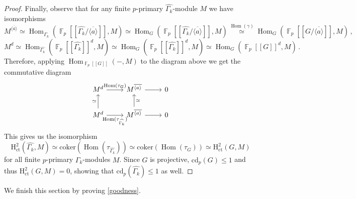 \documentclass[a4paper]{amsart}
\theoremstyle{definition}
\theoremstyle{remark}
\DeclareMathOperator{\bbf}{\mathbb{F}}
\DeclareMathOperator{\Hom}{\mathrm{Hom}}
\newcommand{\FFalgebra}[1]{\bbf_p[\![#1]\!]}
\newcommand{\HH}{\mathrm{H}}
\begin{document}
\begin{proof}
Finally, observe that for any finite \(p\)-primary \(\widehat{\Gamma_k}\)-module \(M\) we have isomorphisms \[M^{\overline{\langle a \rangle}} \simeq\Hom_{\widehat{\Gamma_k}}(\FFalgebra{\widehat{\Gamma_k}/\overline{\langle a \rangle}}, M) \simeq \Hom_G(\FFalgebra{\widehat{\Gamma_k}/\overline{\langle a \rangle}},M) \overset{\Hom(\gamma)}{\simeq} \Hom_G(\FFalgebra{G/\overline{\langle a \rangle}},M)\,,\]
\[M^d \simeq \Hom_{\widehat{\Gamma_k}}(\FFalgebra{\widehat{\Gamma_k}}^d,M) \simeq \Hom_G(\FFalgebra{\widehat{\Gamma_k}}^d,M) \simeq \Hom_G(\FFalgebra{G}^d,M)\,.\] Therefore, applying \(\Hom_{\FFalgebra{G}}(-,M)\) to the diagram above we get the commutative diagram \[\begin{tikzcd}
M^d \arrow[r, "\Hom(\tau_G)"]                                         & M^{\overline{\langle a \rangle}} \arrow[r]                      & 0 \\
M^d \arrow[r, "\Hom(\tau_{\widehat{\Gamma_k}})"'] \arrow[u, "\simeq"] & M^{\overline{\langle a \rangle}} \arrow[r] \arrow[u, "\simeq"'] & 0
\end{tikzcd}\]
This gives us the isomorphism \[\HH^2_{\mathrm{ct}}(\widehat{\Gamma_k},M) \simeq \mathrm{coker}(\Hom(\tau_{\widehat{\Gamma_k}})) \simeq \mathrm{coker}(\Hom(\tau_G)) \simeq \HH^2_{\mathrm{ct}}(G,M)\] for all finite \(p\)-primary \(\widehat{\Gamma_k}\)-modules \(M\). Since \(G\) is projective, \(\mathrm{cd}_p(G) \leq 1\) and thus \(\HH^2_{\mathrm{ct}}(G,M) = 0\), showing that \(\mathrm{cd}_p(\widehat{\Gamma_k}) \leq 1\) as well.
\end{proof}
 
We finish this section by proving \cref{goodness}.
\end{document}
